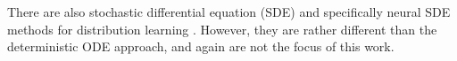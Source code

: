   
    

There are also stochastic differential equation (SDE) and specifically neural SDE methods for distribution learning \citep{NeuralSDE, SongDiffusionModels}. However, they are rather different than the deterministic ODE approach, and again are not the focus of this work.
    


















